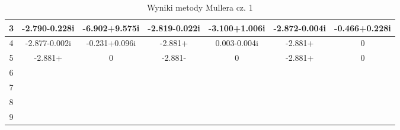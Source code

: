 \documentclass[a4paper, 11pt]{article}
\begin{document}
\begin{enumerate}
\begin{itemize}
\begin{table}[p]
\begin{tabular}{|c|c|c|c|c|c|c|}
3  & -2.790-0.228i & -6.902+9.575i & -2.819-0.022i & -3.100+1.006i & -2.872-0.004i & -0.466+0.228i \\     
\hline                                                                                                       
4  & -2.877-0.002i & -0.231+0.096i & -2.881+  & 0.003-0.004i & -2.881+  & 0  \\       
\hline                                                                                                       
5  & -2.881+  & 0  & -2.881-  & 0  & -2.881+  & 0  \\        
\hline                                                                                                       
6  &  &  &  &  &  &  \\                                                     
\hline                                                                                                       
7  &  &  &  &  &  &  \\                                                     
\hline                                                                                                       
8  &  &  &  &  &  &  \\                                                     
\hline                                                                                                       
9  &  &  &  &  &  &  \\                                                     
\hline                                                                                                       
\end{tabular}                                                                                                
\caption{Wyniki metody Mullera cz. 1}                                                                        
\label{table:Wyniki metody Mullera cz. 1}                                                                    
\end{table}                                                                                                  
\begin{table}[p]                                                                                             
\centering                                                                                                
\hspace*{-2cm}\begin{tabular}{|c|c|c|c|c|c|c|}                                                                          
\hline                                                                                                    

\end{tabular}
\end{table}
\end{itemize}
\end{enumerate}
\end{document}
